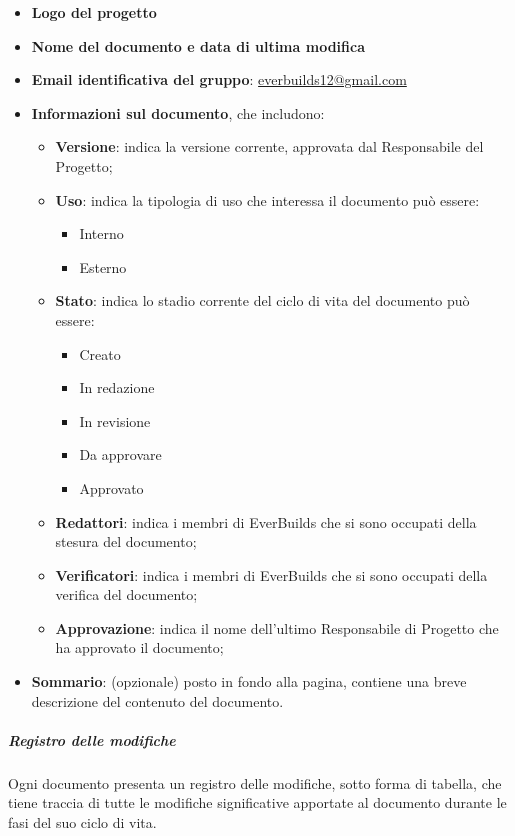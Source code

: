 					\begin{itemize}
						\item\textbf{Logo del progetto}
						\item\textbf{Nome del documento e data di ultima modifica}
						\item\textbf{Email identificativa del gruppo}: \href{mailto:everbuilds12@gmail.com}{everbuilds12@gmail.com}
						\item\textbf{Informazioni sul documento}, che includono: \\
							\begin{itemize}
								\item\textbf{Versione}: indica la versione corrente, approvata dal Responsabile del Progetto;
								\item\textbf{Uso}: indica la tipologia di uso che interessa il documento può essere:
									\begin{itemize}
										\item Interno
										\item Esterno
									\end{itemize}
								\item\textbf{Stato}: indica lo stadio corrente del ciclo di vita del documento può essere: 
									\begin{itemize}
										\item Creato
										\item In redazione
										\item In revisione
										\item Da approvare
										\item Approvato
									\end{itemize}
								\item\textbf{Redattori}: indica i membri di EverBuilds che si sono occupati della stesura del documento;
								\item\textbf{Verificatori}: indica i membri di EverBuilds che si sono occupati della verifica del documento;
								\item\textbf{Approvazione}: indica il nome dell’ultimo Responsabile di Progetto che ha approvato il documento;
							\end{itemize}
						\item\textbf{Sommario}: (opzionale) posto in fondo alla pagina, contiene una breve descrizione del contenuto del documento.
					\end{itemize}
				\subparagraph{Registro delle modifiche}
					Ogni documento presenta un registro delle modifiche, sotto forma di tabella, che tiene traccia di tutte le modifiche significative apportate al documento durante le fasi del suo ciclo di vita. \\

